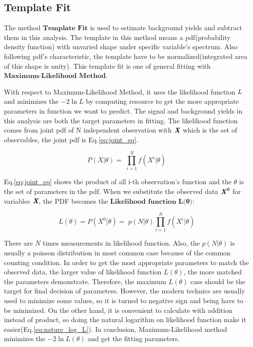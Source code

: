 	\subsection{Template Fit}
	\label{ssec:TemplateFit}

		The method $\textbf{Template Fit}$ is used to estimate background yields and subtract them in this analysis. The template in this method means a pdf(probability density function) with unvaried shape under specific variable's spectrum. Also following pdf's characteristic, the template have to be normalized(integrated area of this shape is unity). This template fit is one of general fitting with $\textbf{Maximum-Likelihood Method}$. 

		With respect to Maximum-Likelihood Method, it uses the likelihood function $\emph{L}$ and minimizes the $-2\ln{L}$ by computing resource to get the more appropriate parameters in function we want to predict. The signal and background yields in this analysis are both the target parameters in fitting. The likelihood function comes from joint pdf of N independent observation with $\emph{\textbf{X}}$ which is the set of observables, the joint pdf is Eq.\ref{eq:joint_eq}. 

		\begin{equation}
		P(X|\theta) = 􏱛 \prod_{i=1}^{N} f(X^i|\theta)
		\label{eq:joint_eq}
		\end{equation}

		 Eq.\ref{eq:joint_eq} shows the product of all i-th observation's function and the $\theta$ is the set of parameters in the pdf. When we substitute the observed data $\emph{\textbf{X}}^{\emph{\textbf{0}}}$ for variables $\emph{\textbf{X}}$, the PDF becomes the $\textbf{Likelihood function L(} \boldsymbol{\theta} \textbf{)}$:

		\begin{equation}
		L(\theta) = P(X^0|\theta) = 􏱛p(N|\theta) \prod_{i=1}^{N} f(X^i|\theta)
		\label{eq:likelihood_fn}
		\end{equation}

		There are $N$ times measurements in likelihood function. Also, the $p(N|\theta)$ is usually a poisson distribution in most common case because of the common counting condition. In order to get the most appropriate parameters to match the observed data, the larger value of likelihood function $L(\theta)$, the more matched the parameters demonstrate. Therefore, the maximum $L(\theta)$ case should be the target for final decision of parameters. However, the modern technics are usually used to minimize some values, so it is turned to negative sign and being have to be minimized. On the other hand, it is convenient to calculate with addition instead of product, so doing the natural logarithm on likelihood function make it easier(Eq.\ref{eq:nature_log_L}). In conclusion, Maximum-Likelihood method minimizes the $-2\ln{L(\theta)}$ and get the fitting parameters.

